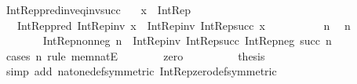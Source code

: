 \begin{isabellebody}
\endisatagproof
{\isafoldproof}%
%
\isadelimproof
\isanewline
%
\endisadelimproof
\isanewline
{}\isamarkupfalse%
\ Int{\isacharunderscore}{\kern0pt}Rep{\isacharunderscore}{\kern0pt}pred{\isacharunderscore}{\kern0pt}inv{\isacharunderscore}{\kern0pt}eq{\isacharunderscore}{\kern0pt}inv{\isacharunderscore}{\kern0pt}succ{\isacharcolon}{\kern0pt}\isanewline
\ \ \ {\isachardoublequoteopen}x\ {\isacharcolon}{\kern0pt}\ Int{\isacharunderscore}{\kern0pt}Rep{\isachardoublequoteclose}\isanewline
\ \ \ {\isachardoublequoteopen}Int{\isacharunderscore}{\kern0pt}Rep{\isacharunderscore}{\kern0pt}pred\ {\isacharparenleft}{\kern0pt}Int{\isacharunderscore}{\kern0pt}Rep{\isacharunderscore}{\kern0pt}inv\ x{\isacharparenright}{\kern0pt}\ {\isacharequal}{\kern0pt}\ Int{\isacharunderscore}{\kern0pt}Rep{\isacharunderscore}{\kern0pt}inv\ {\isacharparenleft}{\kern0pt}Int{\isacharunderscore}{\kern0pt}Rep{\isacharunderscore}{\kern0pt}succ\ x{\isacharparenright}{\kern0pt}{\isachardoublequoteclose}\isanewline
%
\isadelimproof
%
\endisadelimproof
%
\isatagproof
{}\isamarkupfalse%
\ {\isacharminus}{\kern0pt}\isanewline
\ \ \isacommand{{\isacharbraceleft}{\kern0pt}}\isamarkupfalse%
\isanewline
\ \ \ \ \isamarkupfalse%
\ n\ \isamarkupfalse%
\ {\isachardoublequoteopen}n\ {\isasymin}\ {\isasymnat}{\isachardoublequoteclose}\isanewline
\ \ \ \ \isamarkupfalse%
\ \isamarkupfalse%
\isanewline
\ \ \ \ \ \ {\isachardoublequoteopen}Int{\isacharunderscore}{\kern0pt}Rep{\isacharunderscore}{\kern0pt}nonneg\ n\ {\isacharequal}{\kern0pt}\ Int{\isacharunderscore}{\kern0pt}Rep{\isacharunderscore}{\kern0pt}inv\ {\isacharparenleft}{\kern0pt}Int{\isacharunderscore}{\kern0pt}Rep{\isacharunderscore}{\kern0pt}succ\ {\isacharparenleft}{\kern0pt}Int{\isacharunderscore}{\kern0pt}Rep{\isacharunderscore}{\kern0pt}neg\ {\isacharparenleft}{\kern0pt}succ\ n{\isacharparenright}{\kern0pt}{\isacharparenright}{\kern0pt}{\isacharparenright}{\kern0pt}{\isachardoublequoteclose}\isanewline
\ \ \ \ \isamarkupfalse%
\ {\isacharparenleft}{\kern0pt}cases\ n\ rule{\isacharcolon}{\kern0pt}\ mem{\isacharunderscore}{\kern0pt}natE{\isacharparenright}{\kern0pt}\isanewline
\ \ \ \ \ \ \isamarkupfalse%
\ zero\isanewline
\ \ \ \ \ \ \isamarkupfalse%
\ \isamarkupfalse%
\ {\isacharquery}{\kern0pt}thesis\isanewline
\ \ \ \ \ \ \ \ \isamarkupfalse%
\ {\isacharparenleft}{\kern0pt}simp\ add{\isacharcolon}{\kern0pt}\ nat{\isacharunderscore}{\kern0pt}one{\isacharunderscore}{\kern0pt}def{\isacharbrackleft}{\kern0pt}symmetric{\isacharbrackright}{\kern0pt}\ Int{\isacharunderscore}{\kern0pt}Rep{\isacharunderscore}{\kern0pt}zero{\isacharunderscore}{\kern0pt}def{\isacharbrackleft}{\kern0pt}symmetric{\isacharbrackright}{\kern0pt}{\isacharparenright}{\kern0pt}\isanewline

\end{isabellebody}

